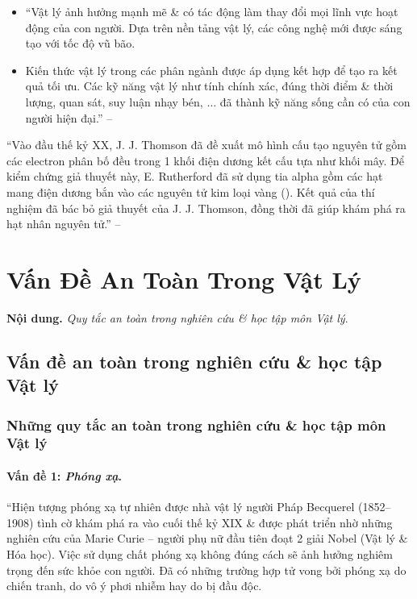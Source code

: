 \documentclass[oneside]{book}
\numberwithin{equation}{section}
\begin{document}
\begin{itemize}
	\item ``Vật lý ảnh hưởng mạnh mẽ \& có tác động làm thay đổi mọi lĩnh vực hoạt động của con người. Dựa trên nền tảng vật lý, các công nghệ mới được sáng tạo với tốc độ vũ bão.
	\item Kiến thức vật lý trong các phân ngành được áp dụng kết hợp để tạo ra kết quả tối ưu. Các kỹ năng vật lý như tính chính xác, đúng thời điểm \& thời lượng, quan sát, suy luận nhạy bén, $\ldots$ đã thành kỹ năng sống cần có của con người hiện đại.'' -- \cite[p. 11]{SGK_Vat_Ly_10_Chan_Troi_Sang_Tao}
\end{itemize}
``Vào đầu thế kỷ XX, J. J. Thomson đã đề xuất mô hình cấu tạo nguyên tử gồm các electron phân bố đều trong 1 khối điện dương kết cấu tựa như khối mây. Để kiểm chứng giả thuyết này, E. Rutherford đã sử dụng tia alpha gồm các hạt mang điện dương bắn vào các nguyên tử kim loại vàng (\cite[Hình 1P.1: \textsf{Thí nghiệm Rutherford}, p. 11]{SGK_Vat_Ly_10_Chan_Troi_Sang_Tao}). Kết quả của thí nghiệm đã bác bỏ giả thuyết của J. J. Thomson, đồng thời đã giúp khám phá ra hạt nhân nguyên tử.'' -- \cite[p. 11]{SGK_Vat_Ly_10_Chan_Troi_Sang_Tao}


\section{Vấn Đề An Toàn Trong Vật Lý}
\textbf{Nội dung.} \textit{Quy tắc an toàn trong nghiên cứu \& học tập môn Vật lý}.

\subsection{Vấn đề an toàn trong nghiên cứu \& học tập Vật lý}

\subsubsection{Những quy tắc an toàn trong nghiên cứu \& học tập môn Vật lý}

\paragraph{Vấn đề 1: \textit{Phóng xạ}.} ``Hiện tượng phóng xạ tự nhiên được nhà vật lý người Pháp Becquerel (1852--1908) tình cờ khám phá ra vào cuối thế kỷ XIX \& được phát triển nhờ những nghiên cứu của Marie Curie -- người phụ nữ đầu tiên đoạt 2 giải Nobel (Vật lý \& Hóa học). Việc sử dụng chất phóng xạ không đúng cách sẽ ảnh hưởng nghiêm trọng đến sức khỏe con người. Đã có những trường hợp tử vong bởi phóng xạ do chiến tranh, do vô ý phơi nhiễm hay do bị đầu độc.
\end{document}
